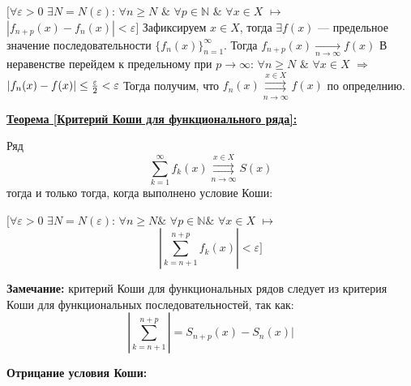 \documentclass[a4paper,12pt]{article} %
\begin{document}
\hspace*{5mm}$\big[\forall \varepsilon > 0 $  $\exists N = N(\varepsilon)$: $\forall n \geq N$  $\&$ $\forall p \in  \mathds{N}$ $\&$ $\forall x \in X$ $\longmapsto$ \newline 
\hspace*{50mm}$|f_{n+p}(x) -f_n(x)| < \varepsilon\big]$
\newline \newline 
Зафиксируем $x \in X$, тогда $\exists f(x)$ --- предельное значение последовательности $\{f_n(x)\}_{n=1}^\infty$. \newline \newline 
Тогда $f_{n+p}(x) \underset{n \longrightarrow \infty}{\longrightarrow} f(x)$ \newline \newline 
В неравенстве перейдем к предельному при $p \longrightarrow \infty$:\newline 
\hspace*{20mm}$\forall n \geq N$ $\&$ $\forall x \in X$ $\Rightarrow$ $|f_n(x) - f(x)| \leq {\varepsilon \over 2} < \varepsilon$  
\newline \newline 
Тогда получим, что $f_n(x) \overset{x \in X}{\underset{n \rightarrow \infty}{\rightrightarrows}} f(x)$ по определнию.
\newline \newline 

\noindent \underline{\textbf{Теорема [Критерий Коши для функционального ряда]:}}

Ряд $$\sum\limits_{k = 1}^{\infty}  f_k(x) \overset{x \in X}{\underset{n \rightarrow \infty}{\rightrightarrows}} S(x)$$ тогда и только тогда, когда выполнено условие Коши: 
\newline 

\hspace*{5mm}$\big[\forall \varepsilon > 0 $  $\exists N = N(\varepsilon)$: $\forall n \geq N \& $   $\forall p \in  \mathds{N} \&$ $\forall x \in X$ $\longmapsto$ \newline 
\hspace*{50mm}$$|\sum\limits_{k = n+1}^{n+p}f_k(x)| < \varepsilon\big]$$

\textbf{Замечание:} критерий Коши для функциональных рядов следует из критерия Коши для функциональных последовательностей, так как: \newline 
$$|\sum\limits_{k = n+1}^{n+p}| = S_{n+p}(x) - S_n(x)|$$

\textbf{Отрицание условия Коши:} 
\newline 
\end{document}
